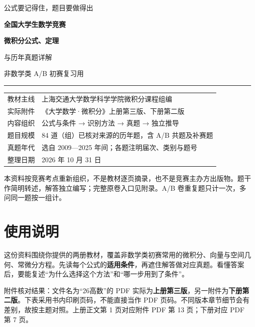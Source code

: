 \documentclass[UTF8,11pt,oneside,openany,fontset=windows]{ctexbook}
\begin{document}
\begin{titlepage}
\thispagestyle{empty}
\vspace*{20mm}
{\color{accent}\Large 公式要记得住，题目要做得出\par}
\vspace{10mm}
{\Huge\bfseries\color{ink}全国大学生数学竞赛\par}
\vspace{5mm}
{\huge\bfseries 微积分公式、定理\par 与历年真题详解\par}
\vspace{12mm}
{\Large 非数学类 A/B 初赛复习用\par}
\vspace{9mm}
\hrule\vspace{6mm}
\begin{tabular}{@{}rl@{}}
教材主线 & 上海交通大学数学科学学院微积分课程组编\\[3pt]
实际附件 & 《大学数学·微积分》上册第三版、下册第二版\\[3pt]
内容组织 & 公式与条件 → 识别方法 → 真题 → 独立推导\\[3pt]
题目规模 & 84 道（组）已核对来源的历年题，含 A/B 共题及补赛题\\[3pt]
真题年代 & 选自 2009—2025 年间；各题注明届次、类别与题号\\[3pt]
整理日期 & 2026 年 10 月 31 日
\end{tabular}
\vfill
{\small 本资料按竞赛考点重新组织，不是教材逐页摘录，也不是竞赛主办方出版物。题干作简明转述，解答独立编写；完整原卷入口见附录。A/B 卷重复题只计一次，多问同一题按一组计。}
\end{titlepage}
\frontmatter
\chapter*{使用说明}
这份资料围绕你提供的两册教材，覆盖非数学类初赛常用的微积分、向量与空间几何、常微分方程。先读每个公式的\textbf{适用条件}，再遮住解答做对应真题。看懂答案后，要能复述“为什么选择这个方法”和“哪一步用到了条件”。

附件核对结果：文件名为“26高数”的 PDF 实际为\textbf{上册第三版}，另一附件为\textbf{下册第二版}。下表采用书内印刷页码，不能直接当作 PDF 页码。不同版本章节细节会有差别，故按主题对照。上册正文第 1 页对应附件 PDF 第 13 页；下册对应 PDF 第 7 页。
\end{document}
